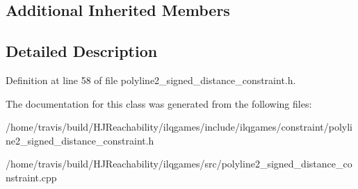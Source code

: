 \subsection*{Additional Inherited Members}


\subsection{Detailed Description}


Definition at line 58 of file polyline2\+\_\+signed\+\_\+distance\+\_\+constraint.\+h.



The documentation for this class was generated from the following files\+:\begin{DoxyCompactItemize}
\item 
/home/travis/build/\+H\+J\+Reachability/ilqgames/include/ilqgames/constraint/polyline2\+\_\+signed\+\_\+distance\+\_\+constraint.\+h\item 
/home/travis/build/\+H\+J\+Reachability/ilqgames/src/polyline2\+\_\+signed\+\_\+distance\+\_\+constraint.\+cpp\end{DoxyCompactItemize}
